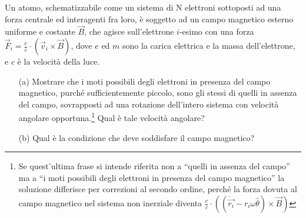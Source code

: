 \documentclass[../main.tex]{subfiles}
\begin{document}
  \textex
  Un atomo, schematizzabile come un sistema di N elettroni sottoposti ad una forza centrale ed interagenti fra loro, \`e soggetto ad un campo magnetico esterno uniforme e costante $\vec B$, che agisce sull'elettrone $i$-esimo con una forza $\vec F_i = \frac{e}{c} \cdot \left(\vec v_i \times \vec B\right)$, dove $e$ ed $m$ sono la carica elettrica e la massa dell'elettrone, e $c$ \`e la velocit\`a della luce.

  \begin{itemize}
    \item[(a)] Mostrare che i moti possibili degli elettroni in presenza del campo magnetico, purch\'e sufficientemente piccolo, sono gli stessi di quelli in assenza del campo, sovrapposti ad una rotazione dell'intero sistema con velocit\`a angolare opportuna.\footnote{Se quest'ultima frase si intende riferita non a ``quelli in assenza del campo'' ma a ``i moti possibili degli elettroni in presenza del campo magnetico'' la soluzione differisce per correzioni al secondo ordine, perch\'e la forza dovuta al campo magnetico nel sistema non inerziale diventa $\frac{e}{c} \cdot \left( \left(\dot {\vec {r_i}} - r_i \omega \hat \theta \right) \times \vec B\right)$} \newline
    Qual \`e tale velocit\`a angolare?
    \item[(b)]Qual \`e la condizione che deve soddisfare il campo magnetico?
  \end{itemize}
\end{document}
